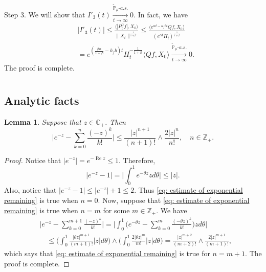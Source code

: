 \documentclass[12pt,a4paper]{amsart}
\theoremstyle{plain}
\newtheorem{lem}[thm]{Lemma}
\theoremstyle{definition}
\numberwithin{equation}{section}
\begin{document}
	Step 3. We will show that $I'_3(t) \xrightarrow[t\to \infty]{\tilde {\mathbb P}_\mu \text{-} a.s.} 0$.
In fact, we have
\begin{equation}\begin{split}
	&|I'_3(t)|
     \leq \frac{\langle |P^\alpha_tf|,X_0\rangle}{\|X_t\|^{\frac{1}{1+\beta}}}
	\leq \frac{\langle e^{\alpha t - \kappa_f b t}Qf,X_0\rangle}{(e^{\alpha t} H_t)^{\frac{1}{1+\beta}}}
	\\& = e^{(\frac{\beta \alpha }{1+\beta} - k_fb)t} H_t^{-\frac{1}{1+\beta}} \langle Qf,X_0\rangle
	\xrightarrow[t\to \infty]{\tilde {\mathbb P}_\mu \text{-} a.s.} 0.
\end{split}\end{equation}
	The proof is complete.

\appendix
\section{}

\subsection{Analytic facts}
\begin{lem}
\label{lem: estimate of exponential remaining}
    Suppose that $z\in \mathbb C_+$. Then
\begin{equation}
\label{eq: estimate of exponential remaining}
    \Big|e^{-z} - \sum_{k=0}^n \frac{(-z)^k}{k!} \Big|
    \leq \frac{|z|^{n+1}}{(n+1)!} \wedge \frac{2|z|^{n}}{n!}, \quad n\in \mathbb Z_+.
\end{equation}
\end{lem}
\begin{proof}
    Notice that $|e^{-z}| = e^{- \operatorname{Re} z} \leq 1$.
    Therefore,
\begin{equation}
    |e^{-z} - 1| = \Big| \int_0^1 e^{-\theta z} z d\theta\Big|
    \leq |z|.
\end{equation}
    Also, notice that $|e^{-z} - 1| \leq |e^{-z}|+1 \leq 2$.
    Thus \eqref{eq: estimate of exponential remaining} is true when $n = 0$.
    Now, suppose that \eqref{eq: estimate of exponential remaining} is true when $n = m$ for some $m \in \mathbb Z_+$.
    We have
\begin{equation}\begin{split}
    &\Big|e^{-z} - \sum_{k=0}^{m+1} \frac{(-z)^k}{k!}\Big|
    = \Big| \int_0^1\Big(e^{-\theta z} - \sum_{k=0}^m \frac{(-\theta z)^k}{k!} \Big) z d\theta \Big|
    \\&\quad \leq  \Big(\int_0^1 \frac{|\theta z|^{m+1}}{(m+1)!} |z| d\theta\Big) \wedge \Big(\int_0^1 \frac{2|\theta z|^{m}}{m!} |z| d\theta\Big)
    = \frac{|z|^{m+2}}{(m+2)!} \wedge \frac{2|z|^{m+1}}{(m+1)!},
\end{split}\end{equation}
    which says that \eqref{eq: estimate of exponential remaining} is true for $n = m + 1$.
    The proof is complete.
\end{proof}
\end{document}
